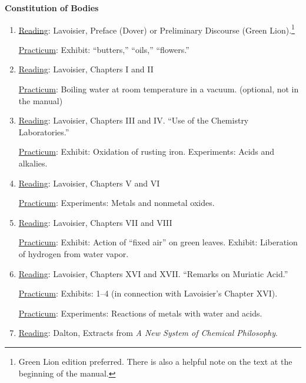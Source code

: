 \documentclass{article}
\newcommand{\rd}{\uline{Reading}}
\newcommand{\pc}{\uline{Practicum}}
\begin{document}
\newpage

\thispagestyle{plain}
\pagestyle{fancy}
\fancyhead{}




\begin{center}
\textbf{Constitution of Bodies}
\end{center}

\begin{enumerate}
\item \rd: Lavoisier, Preface (Dover) or Preliminary Discourse (Green Lion).\footnote{Green Lion edition preferred. There is also a helpful note on the text at the beginning of the manual.} 

\pc:	Exhibit: ``butters,'' ``oils,'' ``flowers.''

\item \rd: Lavoisier, Chapters I and II  

	\pc: Boiling water at room temperature in a
vacuum. (optional, not in the manual)

\item \rd: Lavoisier, Chapters III and IV. ``Use of the Chemistry Laboratories.''  

	\pc: Exhibit: Oxidation of rusting iron. Experiments:
Acids and alkalies.

\item \rd: Lavoisier, Chapters V and VI  

	\pc: Experiments: Metals and nonmetal oxides.
	
\item \rd: Lavoisier, Chapters VII and VIII  

	\pc: Exhibit: Action of ``fixed
air'' on green leaves. Exhibit: Liberation of hydrogen from water vapor.

\item \rd: Lavoisier, Chapters XVI and XVII. ``Remarks on Muriatic Acid.''  

	\pc: Exhibits: 1--4 (in connection with Lavoisier’s Chapter XVI).
	
	\pc: Experiments: Reactions of metals with water and acids.

\item \rd: Dalton, Extracts from \emph{A New System of Chemical Philosophy}. 


\end{enumerate}
\end{document}

